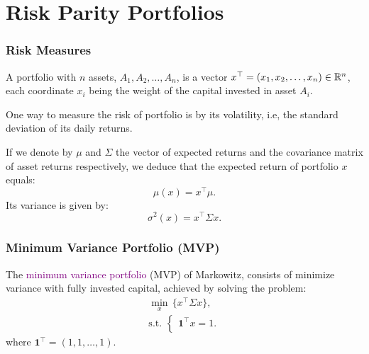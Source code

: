 \section{Risk Parity Portfolios}

\begin{frame}[t]\frametitle{Risk Measures}\bigskip
	\begin{definition}[5.1]
		A portfolio with $n$ assets, $A_1, A_2, \dots, A_n$, is a vector $x^\top = (x_1, x_2, \dots, x_n)\in \mathbb{R}^n$, each coordinate $x_i$ being the weight of the capital invested in asset $A_i$.
	\end{definition}

	\bigskip

	One way to measure the risk of portfolio is by its volatility, i.e, the standard deviation of its daily returns.

	\bigskip

	If we denote by $\mu$ and $\Sigma$ the vector of expected returns and the covariance matrix of asset returns respectively, we deduce that the expected return of portfolio $x$ equals:
	\begin{equation}
		\mu(x) = x^\top \mu.
	\end{equation}
	Its variance is given by:
	\begin{equation}
		\sigma^2(x) = x^\top \Sigma x.
	\end{equation}
\end{frame}

\begin{frame}[t]\frametitle{Minimum Variance Portfolio (MVP)}\bigskip
	The \textcolor{purple}{minimum variance portfolio} (MVP) of Markowitz, consists of minimize variance with fully invested capital, achieved by solving the problem:
	\begin{eqnarray}\label{eq:MVP}
		\min_{x} \,\big\{x^\top \Sigma x\big\}, \\
		\mbox{s.t. }\left\{
		\begin{aligned}
			\mathbf{1}^\top x=1. \\
		\end{aligned}
		\right.\nonumber
	\end{eqnarray}
	where $\textbf{1}^\top =(1,1,\dots,1)$.
\end{frame}

